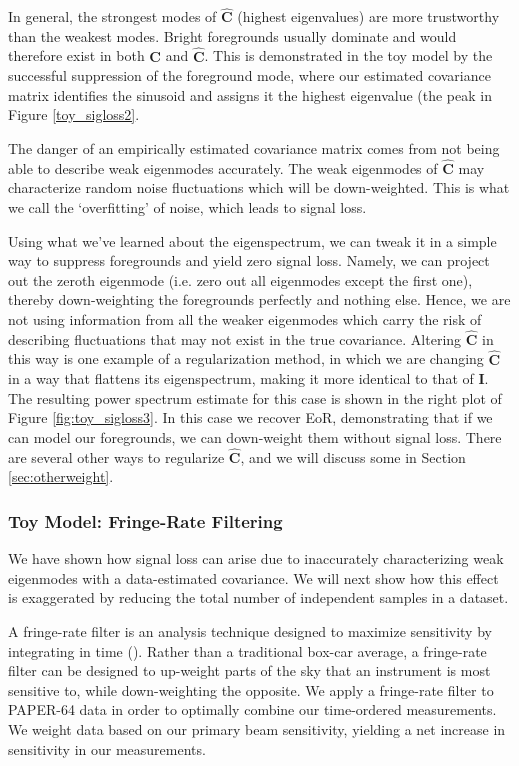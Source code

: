 \documentclass[preprint2,numberedappendix,tighten]{aastex6}  %
\begin{document}
In general, the strongest modes of $\hat{\textbf{C}}$ (highest eigenvalues) are more trustworthy than the weakest modes. Bright foregrounds usually dominate and would therefore exist in both $\textbf{C}$ and $\hat{\textbf{C}}$. This is demonstrated in the toy model by the successful suppression of the foreground mode, where our estimated covariance matrix identifies the sinusoid and assigns it the highest eigenvalue (the peak in Figure \ref{toy_sigloss2}. 

The danger of an empirically estimated covariance matrix comes from not being able to describe weak eigenmodes accurately. The weak eigenmodes of $\hat{\textbf{C}}$ may characterize random noise fluctuations which will be down-weighted. This is what we call the `overfitting' of noise, which leads to signal loss. 

Using what we've learned about the eigenspectrum, we can tweak it in a simple way to suppress foregrounds and yield zero signal loss. Namely, we can project out the zeroth eigenmode (i.e. zero out all eigenmodes except the first one), thereby down-weighting the foregrounds perfectly and nothing else. Hence, we are not using information from all the weaker eigenmodes which carry the risk of describing fluctuations that may not exist in the true covariance. Altering $\hat{\textbf{C}}$ in this way is one example of a regularization method, in which we are changing $\hat{\textbf{C}}$ in a way that flattens its eigenspectrum, making it more identical to that of $\textbf{I}$. The resulting power spectrum estimate for this case is shown in the right plot of Figure \ref{fig:toy_sigloss3}. In this case we recover EoR, demonstrating that if we can model our foregrounds, we can down-weight them without signal loss. There are several other ways to regularize $\hat{\textbf{C}}$, and we will discuss some in Section \ref{sec:otherweight}.

\subsubsection{Toy Model: Fringe-Rate Filtering}

We have shown how signal loss can arise due to inaccurately characterizing weak eigenmodes with a data-estimated covariance. We will next show how this effect is exaggerated by reducing the total number of independent samples in a dataset. 

A fringe-rate filter is an analysis technique designed to maximize sensitivity by integrating in time (\citealt{parsons_et_al2016}). Rather than a traditional box-car average, a fringe-rate filter can be designed to up-weight parts of the sky that an instrument is most sensitive to, while down-weighting the opposite. We apply a fringe-rate filter to PAPER-64 data in order to optimally combine our time-ordered measurements. We weight data based on our primary beam sensitivity, yielding a net increase in sensitivity in our measurements.
\end{document}

